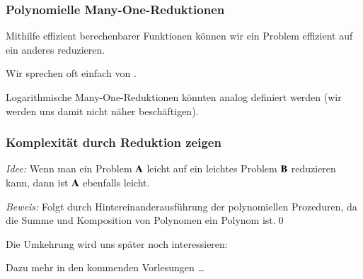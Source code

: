 \documentclass[aspectratio=1610,onlymath]{beamer}
\begin{document}
\begin{frame}\frametitle{Polynomielle Many-One-Reduktionen}

Mithilfe effizient berechenbarer Funktionen können wir ein Problem
effizient auf ein anderes reduzieren.\bigskip

\pause\bigskip

Wir sprechen oft einfach von .
\bigskip

Logarithmische Many-One-Reduktionen könnten analog definiert werden (wir werden uns damit nicht näher beschäftigen).

\end{frame}

\begin{frame}\frametitle{Komplexität durch Reduktion zeigen}

\emph{Idee:} Wenn man ein Problem $\textbf{\textcolor{black}{A}}$ leicht auf ein leichtes Problem $\textbf{\textcolor{black}{B}}$ reduzieren kann,
dann ist $\textbf{\textcolor{black}{A}}$ ebenfalls leicht.\bigskip


\emph{Beweis:} Folgt durch Hintereinanderausführung der polynomiellen Prozeduren, da die Summe und Komposition von Polynomen ein Polynom ist.\qed
\bigskip\pause

Die Umkehrung wird uns später noch interessieren:

\bigskip

Dazu mehr in den kommenden Vorlesungen \ldots

\end{frame}
\end{document}
